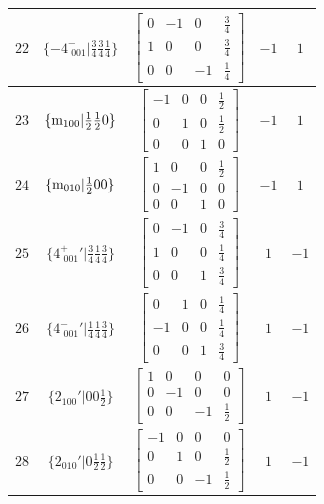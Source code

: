 \documentclass[fleqn,8pt]{jsarticle}
\begin{document}
\begin{longtable}{ccccc}
$ 22 $ & $ \{-4^{-}_{\,\,001}|\frac{3}{4} \frac{3}{4} \frac{1}{4}\} $ & $ \begin{bmatrix} 0 & -1 & 0 & \frac{3}{4} \\ 1 & 0 & 0 & \frac{3}{4} \\ 0 & 0 & -1 & \frac{1}{4} \end{bmatrix} $ & $ -1 $ & $ 1 $ \\ \hline
$ 23 $ & $ \{{\rm m}_{100}|\frac{1}{2} \frac{1}{2} 0\} $ & $ \begin{bmatrix} -1 & 0 & 0 & \frac{1}{2} \\ 0 & 1 & 0 & \frac{1}{2} \\ 0 & 0 & 1 & 0 \end{bmatrix} $ & $ -1 $ & $ 1 $ \\ \hline
$ 24 $ & $ \{{\rm m}_{010}|\frac{1}{2} 0 0\} $ & $ \begin{bmatrix} 1 & 0 & 0 & \frac{1}{2} \\ 0 & -1 & 0 & 0 \\ 0 & 0 & 1 & 0 \end{bmatrix} $ & $ -1 $ & $ 1 $ \\ \hline
$ 25 $ & $ \{4^{+}_{\,\,001}{}'|\frac{3}{4} \frac{1}{4} \frac{3}{4}\} $ & $ \begin{bmatrix} 0 & -1 & 0 & \frac{3}{4} \\ 1 & 0 & 0 & \frac{1}{4} \\ 0 & 0 & 1 & \frac{3}{4} \end{bmatrix} $ & $ 1 $ & $ -1 $ \\ \hline
$ 26 $ & $ \{4^{-}_{\,\,001}{}'|\frac{1}{4} \frac{1}{4} \frac{3}{4}\} $ & $ \begin{bmatrix} 0 & 1 & 0 & \frac{1}{4} \\ -1 & 0 & 0 & \frac{1}{4} \\ 0 & 0 & 1 & \frac{3}{4} \end{bmatrix} $ & $ 1 $ & $ -1 $ \\ \hline
$ 27 $ & $ \{2{}_{100}{}'|0 0 \frac{1}{2}\} $ & $ \begin{bmatrix} 1 & 0 & 0 & 0 \\ 0 & -1 & 0 & 0 \\ 0 & 0 & -1 & \frac{1}{2} \end{bmatrix} $ & $ 1 $ & $ -1 $ \\ \hline
$ 28 $ & $ \{2{}_{010}{}'|0 \frac{1}{2} \frac{1}{2}\} $ & $ \begin{bmatrix} -1 & 0 & 0 & 0 \\ 0 & 1 & 0 & \frac{1}{2} \\ 0 & 0 & -1 & \frac{1}{2} \end{bmatrix} $ & $ 1 $ & $ -1 $ \\ \hline

\end{longtable}
\end{document}
